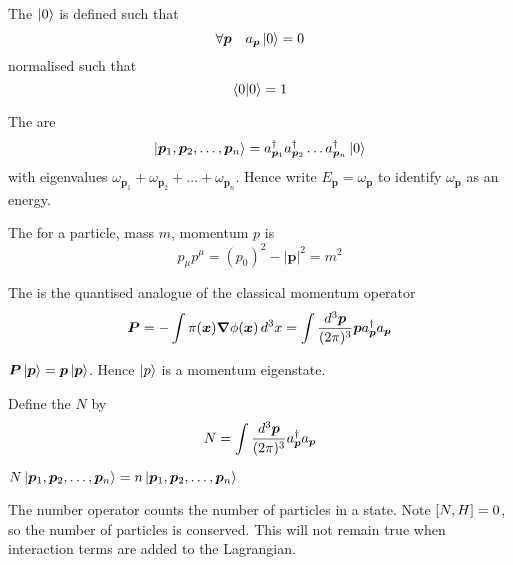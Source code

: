 \documentclass{article}
\begin{document}
\begin{definition}[Vacuum]
The  $\ket{0}$ is defined such that 
\[
\forall \bm{p} \quad a_{\bm{p}} \ket{0} = 0
\]
normalised such that 
\[
\braket{0|0}=1
\]
\end{definition}

\begin{definition}
The  are 
\[
\ket{\bm{p}_1,\bm{p}_2,\dots,\bm{p}_n}=a_{\bm{p}_1}^\dagger a_{\bm{p}_2}^\dagger \dots a_{\bm{p}_n}^\dagger \ket{0}
\]
with eigenvalues $\omega_{\bm{p}_1}+\omega_{\bm{p}_2}+\dots+\omega_{\bm{p}_n}$. Hence write $E_{\bm{p}}=\omega_{\bm{p}}$ to identify $\omega_{\bm{p}}$ as an energy.
\end{definition}

\begin{definition}
The  for a particle, mass $m$, momentum $p$ is 
\[
p_\mu p^\mu = (p_0)^2-|\bm{p}|^2=m^2
\]
\end{definition}

\begin{definition}
The  is the quantised analogue of the classical momentum operator 
\[
\bm{P}=-\int \pi(\bm{x}) \grad\phi(\bm{x}) \, d^3x = \int \tmeas \bm{p} a_{\bm{p}}^\dagger a_{\bm{p}}
\]
\end{definition}

\begin{theorem}
$\bm{P}\ket{\bm{p}}=\bm{p}\ket{\bm{p}}$. Hence $\ket{p}$ is a momentum eigenstate. 
\end{theorem}

\begin{definition}
Define the  $N$ by 
\[
N=\int \tmeas a_{\bm{p}}^\dagger a_{\bm{p}}
\]
\end{definition}

\begin{theorem}
$N\ket{\bm{p}_1,\bm{p}_2,\dots,\bm{p}_n}=n\ket{\bm{p}_1,\bm{p}_2,\dots,\bm{p}_n}$
\end{theorem}

\begin{idea}
The number operator counts the number of particles in a state. Note $\comm[N]{H}=0$, so the number of particles is conserved. This will not remain true when interaction terms are added to the Lagrangian. 
\end{idea}

\end{document}

